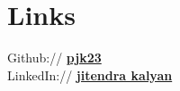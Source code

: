 \documentclass[]{deedy-resume-reversed}
\begin{document}
\begin{minipage}[t]{0.33\textwidth}




\section{Links}
Github:// \href{https://github.com/pjk23}{\bf pjk23} \\
LinkedIn://  \href{ https://www.linkedin.com/in/jitendra-kalyan-ab3256124/}{\bf jitendra kalyan} \\
\sectionsep

\end{minipage}
\end{document}
